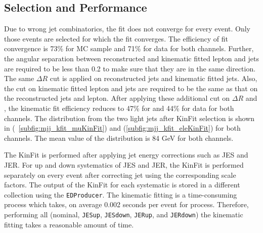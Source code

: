 \subsection{Selection and Performance}
\label{ss:selKF} 
Due to wrong jet combinatorics, the fit does not converge for every event. Only
those events are selected for which the fit converges. The efficiency of fit
convergence is 73\% for MC \ttbar sample and 71\% for data for both channels.
Further, the angular separation between reconstructed and kinematic fitted 
lepton and jets are required to be less than 0.2 to make sure that they are in the same
direction. The same $\Delta R$ cut is applied on reconstructed jets and kinematic
fitted jets. Also, the \pt cut on kinematic fitted lepton and jets are required to
be the same as that on the reconstructed jets and lepton. After applying these additional 
cut on $\Delta R$ and \pt, the kinematic fit efficiency reduces to 47\% for \ttbar 
and 44\% for data for both channels. The \mjj distribution from the two 
light jets after KinFit selection is shown in (~\ref{subfig:mjj_kfit_muKinFit})  
and (\ref{subfig:mjj_kfit_eleKinFit}) for both channels. The mean value of the 
\mjj distribution is 84 GeV for both channels.

The KinFit is performed after applying jet energy corrections such as JES and JER.
For up and down systematics of JES and JER, the KinFit is performed separately 
on every event after correcting jet \pt using the corresponding scale factors.
The output of the KinFit for each systematic is stored in a different collection
using the \verb|EDProducer|. The kinematic fitting is a time-consuming process 
which takes, on average 0.002 seconds per event for \ttbar process. Therefore, 
performing all (nominal, \verb|JESup|, \verb|JESdown|, \verb|JERup|, and 
\verb|JERdown|) the kinematic fitting takes a reasonable amount of time.
